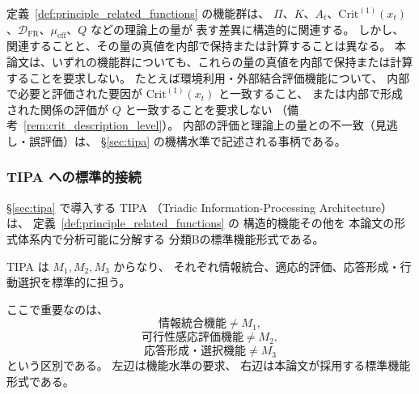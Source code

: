 \begin{remark}[理論上の量への関連と内部での計算の区別]
\label{rem:theory_quantity_vs_internal}
定義~\ref{def:principle_related_functions} の機能群は、
$\Pi$、$K$、$A_t$、$\mathrm{Crit}^{(1)}(x_t)$、$\mathcal{D}_{\mathrm{FR}}$、$\mu_{\mathrm{eff}}$、$Q$ などの理論上の量が
表す差異に構造的に関連する。
しかし、関連することと、その量の真値を内部で保持または計算することは異なる。
本論文は、いずれの機能群についても、これらの量の真値を内部で保持または計算することを要求しない。
たとえば環境利用・外部結合評価機能について、
内部で必要と評価された要因が $\mathrm{Crit}^{(1)}(x_t)$ と一致すること、
または内部で形成された関係の評価が $Q$ と一致することを要求しない
（備考~\ref{rem:crit_description_level}）。
内部の評価と理論上の量との不一致（見逃し・誤評価）は、
\S\ref{sec:tipa} の機構水準で記述される事柄である。
\end{remark}

\subsubsection{TIPA への標準的接続}

\begin{remark}
\label{rem:tipa_as_standard_form}
\S\ref{sec:tipa} で導入する
TIPA
（Triadic Information-Processing Architecture）は、
定義~\ref{def:principle_related_functions} の
構造的機能その他を
本論文の形式体系内で分析可能に分解する
分類Bの標準機能形式である。

TIPA は
$M_1,M_2,M_3$
からなり、
それぞれ情報統合、適応的評価、応答形成・行動選択を標準的に担う。

ここで重要なのは、
\[
  \text{情報統合機能}
  \neq
  M_1,
\]
\[
  \text{可行性感応評価機能}
  \neq
  M_2,
\]
\[
  \text{応答形成・選択機能}
  \neq
  M_3
\]
という区別である。
左辺は機能水準の要求、
右辺は本論文が採用する標準機能形式である。
\end{remark}

